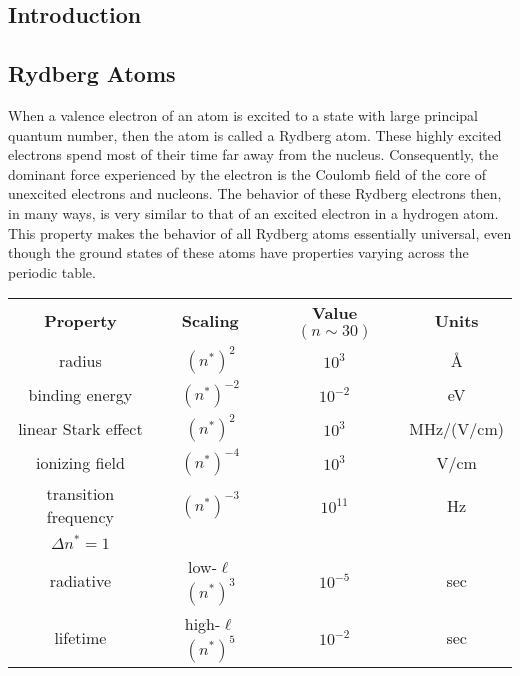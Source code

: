 

\begin{singlespace}

\chapter{Introduction}
\label{intro}
\begpagestyle
{}

\end{singlespace}



\section{Rydberg Atoms}
\hspace{\parindent}  When a valence electron of an atom is excited to a state
with large principal quantum number, then the atom is called a Rydberg atom. 
These highly excited electrons spend most of their time far away from the
nucleus.  Consequently, the dominant force experienced by the electron is the
Coulomb field of the core of unexcited electrons and nucleons.  The behavior
of these Rydberg electrons then, in many ways, is very similar to that of an
excited electron in a hydrogen atom.  This property makes the behavior of
all Rydberg atoms essentially universal, even though the ground states of these
atoms have properties varying across the periodic table.

\begin{table}[t]
\begin{center}
\begin{tabular}{||c|c|c|c||}                                      \hline
{\bf Property}&{\bf Scaling}&{\bf Value $(n\sim 30)$}&{\bf Units}\\ [5pt]
\cline{1-4} 
radius               & $(n^*)^2$        & $10^3$    & \AA \\ [5pt]
\cline{1-4} 
binding energy       & $(n^*)^{-2}$     & $10^{-2}$ & eV  \\ [5pt]
\cline{1-4} 
linear Stark effect  & $(n^*)^2$ & $10^3$ & MHz/(V/cm) \\ [5pt] \cline{1-4}
ionizing field       & $(n^*)^{-4}$     & $10^3$    &V/cm \\ [5pt]
\cline{1-4} 
transition frequency & $(n^*)^{-3}$     & $10^{11}$ & Hz  \\ [5pt]
$\Delta n^* = 1$     &                  &           &     \\ \cline{1-4}
radiative            & low-$\ell$ $(n^*)^3$ & $10^{-5}$ & sec \\ [5pt]
lifetime             & high-$\ell$ $(n^*)^5$ & $10^{-2}$ & sec \\ [5pt] \hline
\end{tabular}
\end{center}
\end{table}

